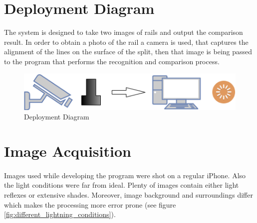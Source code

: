 \section{Deployment Diagram}
The system is designed to take two images of rails and output the comparison result. In order to obtain a photo of the rail a camera is used, that captures the alignment of the lines on the surface of the split, then that image is being passed to the program that performs the recognition and comparison process.
\begin{figure}[h]
	\centering
	\includegraphics[width=\textwidth]{images/deployment_diagram}
	\caption{Deployment Diagram}
\end{figure}

\section{Image Acquisition}
\paragraph{}
Images used while developing the program were shot on a regular iPhone. Also the light conditions were far from ideal. Plenty of images contain either light reflexes or extensive shades. Moreover, image background and surroundings differ which makes the processing more error prone (see figure \ref{fig:different_lightning_conditions}).

